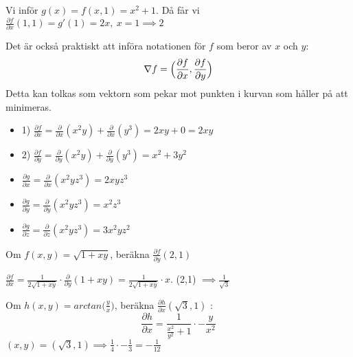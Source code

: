 \documentclass{report}
\begin{document}
{
Vi inför $ g(x) = f(x,1) = x^2+1 $. Då får vi $ \frac{\partial f}{\partial x} (1,1) = g'(1) = 2x,\: x = 1 \implies 2 $  
}

{
Det är också praktiskt att införa notationen för $ f $ som beror av $ x $ och $ y $:
\begin{equation*}
\nabla f = \Bigl( \frac{\partial f}{\partial x}, \frac{\partial f}{\partial y} \Bigr)
\end{equation*}
Detta kan tolkas som vektorn som pekar mot punkten i kurvan som håller på att minimeras.
}

{
\begin{itemize}
	\item 1) $ \frac{\partial f}{\partial x} = \frac{\partial}{\partial x}(x^2y) + \frac{\partial}{\partial x}(y^3) = 2xy + 0 = 2xy$
	\item 2) $ \frac{\partial f}{\partial y} = \frac{\partial}{\partial y}(x^2y) + \frac{\partial}{\partial y}(y^3) = x^2+3y^2 $ 
\end{itemize}
}

{
\begin{itemize}
	\item $ \frac{\partial g}{\partial x} = \frac{\partial}{\partial x} (x^2yz^3) = 2xyz^3 $
	\item $ \frac{\partial g}{\partial y} = \frac{\partial}{\partial y}(x^2yz^3) = x^2z^3 $
	\item $ \frac{\partial g}{\partial z} = \frac{\partial}{\partial z}(x^2yz^3) = 3x^2yz^2$ 
\end{itemize}
}

\qs{}
{
Om $ f(x,y) = \sqrt{1+xy}  $, beräkna $ \frac{\partial f}{\partial y} (2,1) $ 
}

\sol $ \frac{\partial f}{\partial x} = \frac{1}{2 \sqrt{1+xy} } \cdot \frac{\partial}{\partial y}(1+xy) = \frac{1}{2 \sqrt{1+xy} } \cdot x   $. (2,1) $ \implies \frac{1}{ \sqrt{3} }  $  

\vspace{20pt}
\qs{}
{
Om $ h(x,y) = arctan\bigl( \frac{y}{x} \bigr) $, beräkna $ \frac{\partial h}{\partial x} ( \sqrt{3} , 1)$  
}
\sol:
\begin{equation*}
\frac{\partial h }{\partial x} = \frac{1}{ \frac{x^2}{y^2} +1} \cdot - \frac{y}{x^2}   
\end{equation*}
$ (x,y) = ( \sqrt{3} ,1) \implies \frac{1}{4} \cdot - \frac{1}{3} = - \frac{1}{12}  $ 
\end{document}
